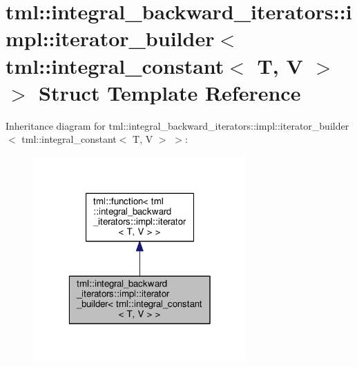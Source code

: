 \hypertarget{structtml_1_1integral__backward__iterators_1_1impl_1_1iterator__builder_3_01tml_1_1integral__constant_3_01_t_00_01_v_01_4_01_4}{\section{tml\+:\+:integral\+\_\+backward\+\_\+iterators\+:\+:impl\+:\+:iterator\+\_\+builder$<$ tml\+:\+:integral\+\_\+constant$<$ T, V $>$ $>$ Struct Template Reference}
\label{structtml_1_1integral__backward__iterators_1_1impl_1_1iterator__builder_3_01tml_1_1integral__constant_3_01_t_00_01_v_01_4_01_4}
}


Inheritance diagram for tml\+:\+:integral\+\_\+backward\+\_\+iterators\+:\+:impl\+:\+:iterator\+\_\+builder$<$ tml\+:\+:integral\+\_\+constant$<$ T, V $>$ $>$\+:
\nopagebreak
\begin{figure}[H]
\begin{center}
\leavevmode
\includegraphics[width=232pt]{structtml_1_1integral__backward__iterators_1_1impl_1_1iterator__builder_3_01tml_1_1integral__con482aa24dadeba9563b7a09171d3eb84f}
\end{center}
\end{figure}


